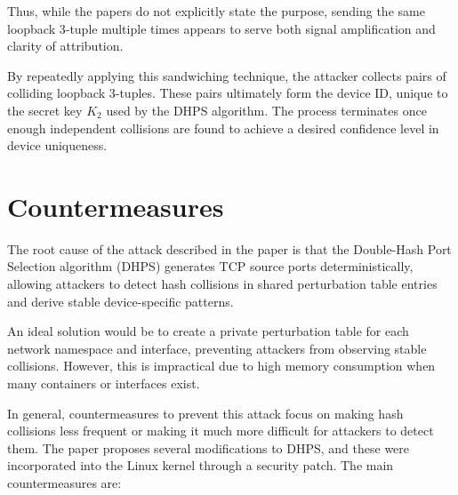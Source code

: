 \documentclass{report}
\begin{document}
Thus, while the papers do not explicitly state the purpose, sending the same loopback 3-tuple multiple times appears to serve both signal amplification and clarity of attribution.

By repeatedly applying this sandwiching technique, the attacker collects pairs of colliding loopback 3-tuples. These pairs ultimately form the device ID, unique to the secret key $K_2$ used by the DHPS algorithm. The process terminates once enough independent collisions are found to achieve a desired confidence level in device uniqueness.

\begin{center}
    \begin{minipage}[t]{0.5\textwidth}
      \vspace{0cm}
      
      
    \end{minipage}
\end{center}

\vspace{0.5cm}
\chapter{Countermeasures}
\label{sec:countermeasures}

The \alert{root cause} of the attack described in the paper is that the Double-Hash Port Selection algorithm (DHPS) generates TCP source ports deterministically, allowing attackers to detect hash collisions in shared perturbation table entries and derive stable device-specific patterns.

An \alert{ideal solution} would be to create a private perturbation table for each network namespace and interface, preventing attackers from observing stable collisions. However, this is impractical due to high memory consumption when many containers or interfaces exist.

In \alert{general}, \alert{countermeasures} to prevent this attack focus on making hash collisions less frequent or making it much more difficult for attackers to detect them. The paper proposes several modifications to DHPS, and these were incorporated into the Linux kernel through a security patch. The main countermeasures are:
\end{document}
